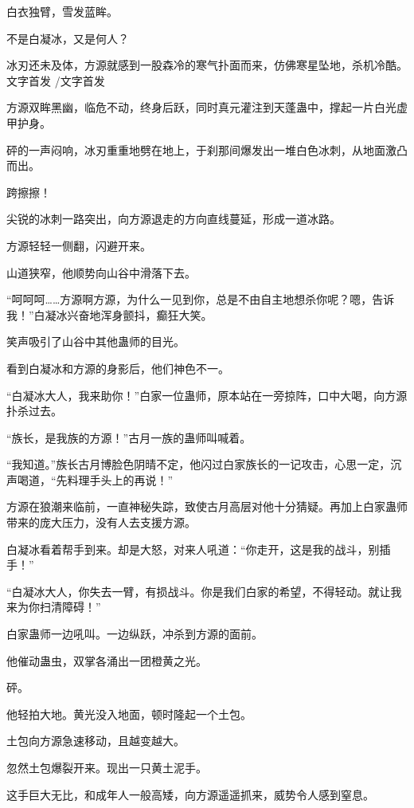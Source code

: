 
\begin{this_body}

白衣独臂，雪发蓝眸。

不是白凝冰，又是何人？

冰刃还未及体，方源就感到一股森冷的寒气扑面而来，仿佛寒星坠地，杀机冷酷。 文字首发 /文字首发

方源双眸黑幽，临危不动，终身后跃，同时真元灌注到天蓬蛊中，撑起一片白光虚甲护身。

砰的一声闷响，冰刃重重地劈在地上，于刹那间爆发出一堆白色冰刺，从地面激凸而出。

跨擦擦！

尖锐的冰刺一路突出，向方源退走的方向直线蔓延，形成一道冰路。

方源轻轻一侧翻，闪避开来。

山道狭窄，他顺势向山谷中滑落下去。

“呵呵呵……方源啊方源，为什么一见到你，总是不由自主地想杀你呢？嗯，告诉我！”白凝冰兴奋地浑身颤抖，癫狂大笑。

笑声吸引了山谷中其他蛊师的目光。

看到白凝冰和方源的身影后，他们神色不一。

“白凝冰大人，我来助你！”白家一位蛊师，原本站在一旁掠阵，口中大喝，向方源扑杀过去。

“族长，是我族的方源！”古月一族的蛊师叫喊着。

“我知道。”族长古月博脸色阴晴不定，他闪过白家族长的一记攻击，心思一定，沉声喝道，“先料理手头上的再说！”

方源在狼潮来临前，一直神秘失踪，致使古月高层对他十分猜疑。再加上白家蛊师带来的庞大压力，没有人去支援方源。

白凝冰看着帮手到来。却是大怒，对来人吼道：“你走开，这是我的战斗，别插手！”

“白凝冰大人，你失去一臂，有损战斗。你是我们白家的希望，不得轻动。就让我来为你扫清障碍！”

白家蛊师一边吼叫。一边纵跃，冲杀到方源的面前。

他催动蛊虫，双掌各涌出一团橙黄之光。

砰。

他轻拍大地。黄光没入地面，顿时隆起一个土包。

土包向方源急速移动，且越变越大。

忽然土包爆裂开来。现出一只黄土泥手。

这手巨大无比，和成年人一般高矮，向方源遥遥抓来，威势令人感到窒息。


\end{this_body}
